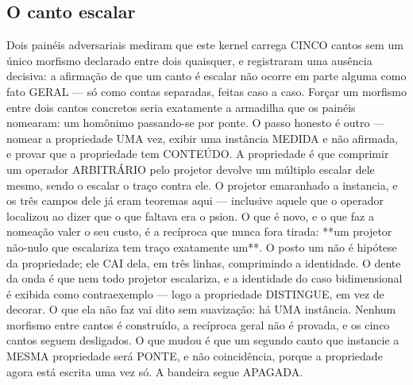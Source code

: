 \documentclass[11pt]{article}
\theoremstyle{definition}\newtheorem{deriv}{Derivação}
\begin{document}
\subsection*{O canto escalar}Dois pain\'eis adversariais mediram que este kernel carrega CINCO cantos sem um \'unico morfismo declarado entre dois quaisquer, e registraram uma aus\^encia decisiva: a afirma\c{c}\~ao de que um canto \'e escalar n\~ao ocorre em parte alguma como fato GERAL --- s\'o como contas separadas, feitas caso a caso. For\c{c}ar um morfismo entre dois cantos concretos seria exatamente a armadilha que os pain\'eis nomearam: um hom\^onimo passando-se por ponte. O passo honesto \'e outro --- nomear a propriedade UMA vez, exibir uma inst\^ancia MEDIDA e n\~ao afirmada, e provar que a propriedade tem CONTE\'UDO. A propriedade \'e que comprimir um operador ARBITR\'ARIO pelo projetor devolve um m\'ultiplo escalar dele mesmo, sendo o escalar o tra\c{c}o contra ele. O projetor emaranhado a instancia, e os tr\^es campos dele j\'a eram teoremas aqui --- inclusive aquele que o operador localizou ao dizer que o que faltava era o psion. O que \'e novo, e o que faz a nomea\c{c}\~ao valer o seu custo, \'e a rec\'iproca que nunca fora tirada: **um projetor n\~ao-nulo que escalariza tem tra\c{c}o exatamente um**. O posto um n\~ao \'e hip\'otese da propriedade; ele CAI dela, em tr\^es linhas, comprimindo a identidade. O dente da onda \'e que nem todo projetor escalariza, e a identidade do caso bidimensional \'e exibida como contraexemplo --- logo a propriedade DISTINGUE, em vez de decorar. O que ela n\~ao faz vai dito sem suaviza\c{c}\~ao: h\'a UMA inst\^ancia. Nenhum morfismo entre cantos \'e constru\'ido, a rec\'iproca geral n\~ao \'e provada, e os cinco cantos seguem desligados. O que mudou \'e que um segundo canto que instancie a MESMA propriedade ser\'a PONTE, e n\~ao coincid\^encia, porque a propriedade agora est\'a escrita uma vez s\'o. A bandeira segue APAGADA.
\end{document}
